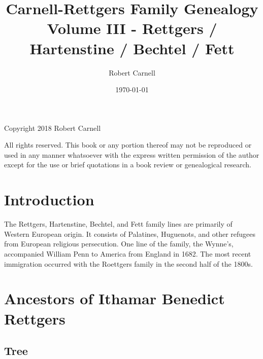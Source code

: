 \documentclass[11pt,letter]{book}
\title{\bf Carnell-Rettgers Family Genealogy \\
       \large Volume III - Rettgers / Hartenstine / Bechtel / Fett}
\author{Robert Carnell}
\date{\today}
\begin{document}
\frontmatter
\maketitle
\clearpage

\begingroup
\parindent 0pt
\parskip
\baselineskip
Copyright \textcopyright{} 2018 Robert Carnell

All rights reserved.  This book or any portion thereof may not be reproduced or used in any manner whatsoever with the express written permission of the author except for the use or brief quotations in a book review or genealogical research.
\endgroup
\clearpage

\tableofcontents
\mainmatter

\chapter{Introduction}

The Rettgers, Hartenstine, Bechtel, and Fett family lines are primarily of Western European origin.  It consists of Palatines, Huguenots, and other refugees from European religious persecution.  One line of the family, the Wynne's, accompanied William Penn to America from England in 1682.  The most recent immigration occurred with the Roettgers family in the second half of the 1800s.

\chapter{Ancestors of Ithamar Benedict Rettgers}

\section{Tree}
\end{document}
